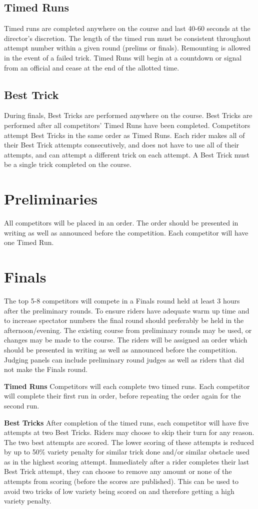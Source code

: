 \subsection{Timed Runs}
Timed runs are completed anywhere on the course and last 40-60 seconds at the director's discretion.
The length of the timed run must be consistent throughout attempt number within a given round (prelims or finals).
Remounting is allowed in the event of a failed trick.
Timed Runs will begin at a countdown or signal from an official and cease at the end of the allotted time.

\subsection{Best Trick}
During finals, Best Tricks are performed anywhere on the course.
Best Tricks are performed after all competitors' Timed Runs have been completed.
Competitors attempt Best Tricks in the same order as Timed Runs.
Each rider makes all of their Best Trick attempts consecutively, and does not have to use all of their attempts, and can attempt a different trick on each attempt.
A Best Trick must be a single trick completed on the course.

\section{Preliminaries}
All competitors will be placed in an order.
The order should be presented in writing as well as announced before the competition.
Each competitor will have one Timed Run.

\section{Finals}
The top 5-8 competitors will compete in a Finals round held at least 3 hours after the preliminary rounds.
To ensure riders have adequate warm up time and to increase spectator numbers the final round should preferably be held in the afternoon/evening.
The existing course from preliminary rounds may be used, or changes may be made to the course.
The riders will be assigned an order which should be presented in writing as well as announced before the competition.
Judging panels can include preliminary round judges as well as riders that did not make the Finals round. 

\textbf{Timed Runs}
Competitors will each complete two timed runs.
Each competitor will complete their first run in order, before repeating the order again for the second run.

\textbf{Best Tricks}
After completion of the timed runs, each competitor will have five attempts at two Best Tricks.
Riders may choose to skip their turn for any reason. 
The two best attempts are scored.
The lower scoring of these attempts is reduced by up to 50\% variety penalty for similar trick done and/or similar obstacle used as in the highest scoring attempt.
Immediately after a rider completes their last Best Trick attempt, they can choose to remove any amount or none of the attempts from scoring (before the scores are published).
This can be used to avoid two tricks of low variety being scored on and therefore getting a high variety penalty.